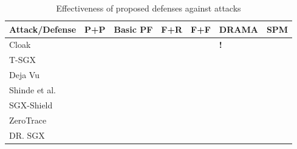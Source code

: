 \begin{table}
	\centering
	\caption{Effectiveness of proposed defenses against attacks}
	\label{tab:one}
	\begin{tabular}{@{}lllllll@{}}
		\toprule
		Attack/Defense & P+P & Basic PF & F+R & F+F & DRAMA & SPM \\ \midrule
		Cloak          &\cmark   &\xmark          &\cmark     &\cmark     &\textbf{!}       &\xmark     \\
		T-SGX          &\xmark   &\cmark          &\xmark     &\xmark     &\cmark       &\xmark     \\
		Deja Vu        &\xmark   &\cmark          &\xmark     &\xmark     &\cmark       &\xmark     \\
		Shinde et al.  &\xmark   &\cmark          &\xmark     &\xmark     &\cmark       &\cmark     \\
		SGX-Shield     &\xmark   &\cmark          &\xmark     &\xmark     &\cmark       &\xmark     \\
		ZeroTrace      &\xmark   &\cmark          &\cmark     &\cmark     &\cmark       &\cmark     \\
		DR. SGX        &\cmark   &\cmark          &\cmark     &\cmark     &\cmark       &\cmark     \\
	\end{tabular}
\end{table}
